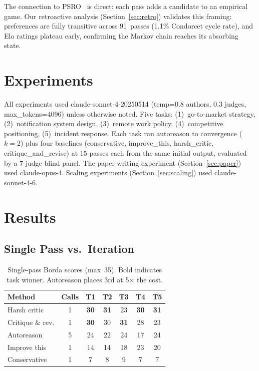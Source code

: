\documentclass[10pt,twocolumn]{article}
\begin{document}
The connection to PSRO~\cite{psro} is direct: each pass adds a candidate to an empirical game. Our retroactive analysis (Section~\ref{sec:retro}) validates this framing: preferences are fully transitive across 91~passes (1.1\% Condorcet cycle rate), and Elo ratings plateau early, confirming the Markov chain reaches its absorbing state.

\section{Experiments}

All experiments used claude-sonnet-4-20250514 (temp=0.8 authors, 0.3 judges, max\_tokens=4096) unless otherwise noted. Five tasks: (1)~go-to-market strategy, (2)~notification system design, (3)~remote work policy, (4)~competitive positioning, (5)~incident response. Each task ran autoreason to convergence ($k{=}2$) plus four baselines (conservative, improve\_this, harsh\_critic, critique\_and\_revise) at 15 passes each from the same initial output, evaluated by a 7-judge blind panel. The paper-writing experiment (Section~\ref{sec:paper}) used claude-opus-4. Scaling experiments (Section~\ref{sec:scaling}) used claude-sonnet-4-6.

\section{Results}

\subsection{Single Pass vs.\ Iteration}
\label{sec:v1}

\begin{table}[H]
\centering
\small
\begin{tabular}{@{}lcccccc@{}}
\toprule
\textbf{Method} & \textbf{Calls} & \textbf{T1} & \textbf{T2} & \textbf{T3} & \textbf{T4} & \textbf{T5} \\
\midrule
\rowcolor{TableShade}
Harsh critic & 1 & \textbf{30} & \textbf{31} & 23 & \textbf{30} & \textbf{31} \\
Critique \& rev. & 1 & \textbf{30} & 30 & \textbf{31} & 28 & 23 \\
\rowcolor{TableShade}
Autoreason & 5 & 24 & 22 & 24 & 17 & 24 \\
Improve this & 1 & 14 & 14 & 18 & 23 & 20 \\
\rowcolor{TableShade}
Conservative & 1 & 7 & 8 & 9 & 7 & 7 \\
\bottomrule
\end{tabular}
\caption{Single-pass Borda scores (max~35). Bold indicates task winner. Autoreason places 3rd at 5$\times$ the cost.}
\label{tab:v1}
\end{table}
\end{document}
